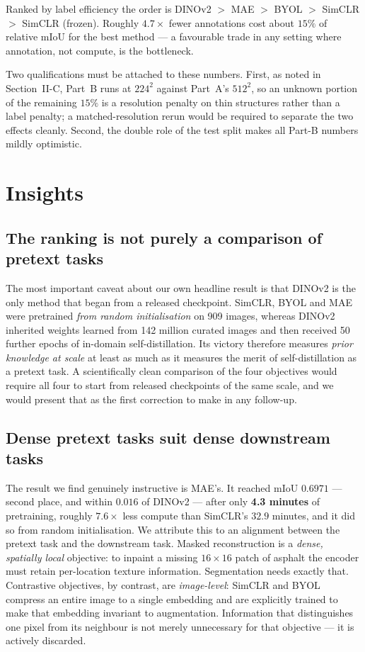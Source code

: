 \documentclass[conference]{IEEEtran}
\begin{document}
Ranked by label efficiency the order is
DINOv2 $>$ MAE $>$ BYOL $>$ SimCLR $>$ SimCLR (frozen).
Roughly $4.7\times$ fewer annotations cost about $15\%$ of relative mIoU for the best
method --- a favourable trade in any setting where annotation, not compute, is the
bottleneck.

Two qualifications must be attached to these numbers. First, as noted in
Section~II-C, Part~B runs at $224^2$ against Part~A's $512^2$, so an unknown portion
of the remaining $15\%$ is a resolution penalty on thin structures rather than a
label penalty; a matched-resolution rerun would be required to separate the two
effects cleanly. Second, the double role of the test split makes all Part-B numbers
mildly optimistic.

\section{Insights}

\subsection{The ranking is not purely a comparison of pretext tasks}
The most important caveat about our own headline result is that DINOv2 is the only
method that began from a released checkpoint. SimCLR, BYOL and MAE were pretrained
\emph{from random initialisation} on 909 images, whereas DINOv2 inherited weights
learned from 142 million curated images and then received 50 further epochs of
in-domain self-distillation. Its victory therefore measures \emph{prior knowledge at
scale} at least as much as it measures the merit of self-distillation as a pretext
task. A scientifically clean comparison of the four objectives would require all four
to start from released checkpoints of the same scale, and we would present that as
the first correction to make in any follow-up.

\subsection{Dense pretext tasks suit dense downstream tasks}
The result we find genuinely instructive is MAE's. It reached mIoU $0.6971$ --- second
place, and within $0.016$ of DINOv2 --- after only \textbf{4.3 minutes} of
pretraining, roughly $7.6\times$ less compute than SimCLR's $32.9$ minutes, and it
did so from random initialisation. We attribute this to an alignment between the
pretext task and the downstream task. Masked reconstruction is a \emph{dense,
spatially local} objective: to inpaint a missing $16\times16$ patch of asphalt the
encoder must retain per-location texture information. Segmentation needs exactly
that. Contrastive objectives, by contrast, are \emph{image-level}: SimCLR and BYOL
compress an entire image to a single embedding and are explicitly trained to make
that embedding invariant to augmentation. Information that distinguishes one pixel
from its neighbour is not merely unnecessary for that objective --- it is actively
discarded.
\end{document}
